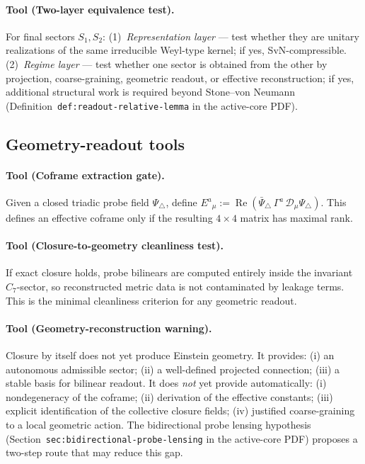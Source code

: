 \documentclass[12pt,a4paper]{article}
\begin{document}
\paragraph{Tool (Two-layer equivalence test).}
For final sectors $S_1, S_2$: (1)~\emph{Representation layer} ---
test whether they are unitary realizations of the same irreducible
Weyl-type kernel; if yes, SvN-compressible. (2)~\emph{Regime layer} ---
test whether one sector is obtained from the other by projection,
coarse-graining, geometric readout, or effective reconstruction; if yes,
additional structural work is required beyond Stone--von Neumann
(Definition~\texttt{def:readout-relative-lemma} in the active-core PDF).

\subsection*{Geometry-readout tools}

\paragraph{Tool (Coframe extraction gate).}
Given a closed triadic probe field $\Psi_\triangle$, define
$E^a{}_\mu := \operatorname{Re}(\bar\Psi_\triangle\,\Gamma^a\,
\mathcal{D}_\mu\Psi_\triangle)$.
This defines an effective coframe only if the resulting $4\times 4$
matrix has maximal rank.

\paragraph{Tool (Closure-to-geometry cleanliness test).}
If exact closure holds, probe bilinears are computed entirely inside
the invariant $C_7$-sector, so reconstructed metric data is not
contaminated by leakage terms. This is the minimal cleanliness
criterion for any geometric readout.

\paragraph{Tool (Geometry-reconstruction warning).}
Closure by itself does not yet produce Einstein geometry. It provides:
(i) an autonomous admissible sector; (ii) a well-defined projected
connection; (iii) a stable basis for bilinear readout. It does
\emph{not} yet provide automatically: (i) nondegeneracy of the
coframe; (ii) derivation of the effective constants; (iii) explicit
identification of the collective closure fields; (iv) justified
coarse-graining to a local geometric action. The bidirectional probe
lensing hypothesis (Section~\texttt{sec:bidirectional-probe-lensing} in the active-core PDF)
proposes a two-step route that may reduce this gap.
\end{document}
